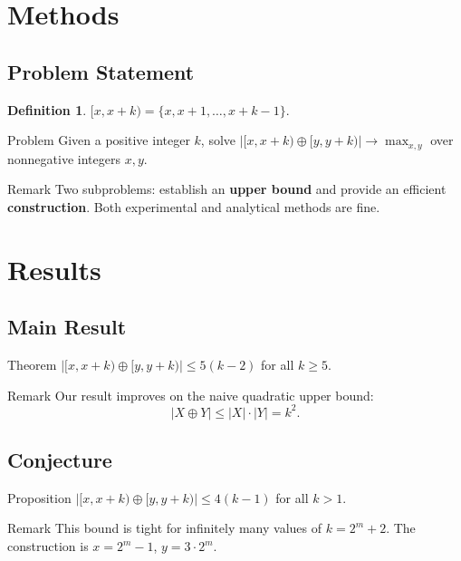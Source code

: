 \documentclass[handout,notheorems]{beamer}
\theoremstyle{definition}
\newtheorem*{definition}{Definition}
\begin{document}
\section{Methods}

\subsection{Problem Statement}

\begin{frame}
    \begin{definition}
        $[x, x+k) = \{x, x+1, \dots, x+k-1\}$.
    \end{definition}
    \pause
    \begin{block}{Problem}
        Given a positive integer $k$, solve $|[x, x+k) \oplus [y, y+k)| \to \max_{x,y}$ over nonnegative integers $x, y$.
    \end{block}
    \pause
    \begin{block}{Remark}
        Two subproblems: establish an \textbf{upper bound} and provide an efficient \textbf{construction}. Both experimental and analytical methods are fine.
    \end{block}
\end{frame}

\section{Results}

\subsection{Main Result}

\begin{frame}
    \begin{block}{Theorem}
        $|[x, x+k) \oplus [y, y+k)| \le 5(k-2)$ for all $k \ge 5$.
    \end{block}
    \pause
    \begin{block}{Remark}
        Our result improves on the naive quadratic upper bound:
        \[|X \oplus Y| \le |X| \cdot |Y| = k^2.\]
    \end{block}
\end{frame}

\subsection{Conjecture}

\begin{frame}
    \begin{block}{Proposition}
        $|[x, x+k) \oplus [y, y+k)| \le 4(k-1)$ for all $k > 1$.
    \end{block}
    \pause
    \begin{block}{Remark}
        This bound is tight for infinitely many values of $k = 2^m + 2$. The construction is $x = 2^m - 1$, $y = 3 \cdot 2^m$.
    \end{block}
\end{frame}
\end{document}

